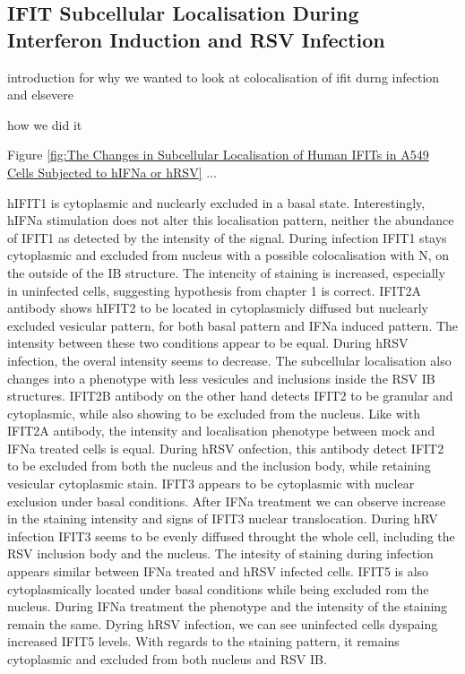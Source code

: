 \subsection{IFIT Subcellular Localisation During Interferon Induction and RSV Infection} \label{subsec:IFIT Subcellular Localisation During Interferon Induction and RSV Infection}
introduction for why we wanted to look at colocalisation of ifit durng infection and elsevere

how we did it

Figure \ref{fig:The Changes in Subcellular Localisation of Human IFITs in A549 Cells Subjected to hIFNa or hRSV} ... 

hIFIT1 is cytoplasmic and nuclearly excluded in a basal state. Interestingly, hIFNa stimulation does not alter this localisation pattern, neither the abundance of IFIT1 as detected by the intensity of the signal. During infection IFIT1 stays cytoplasmic and excluded from nucleus with a possible colocalisation with N, on the outside of the IB structure. The intencity of staining is increased, especially in uninfected cells, suggesting hypothesis from chapter 1 is correct. IFIT2A antibody shows hIFIT2 to be located in cytoplasmicly diffused but nuclearly excluded vesicular pattern, for both basal pattern and IFNa induced pattern. The intensity between these two conditions appear to be equal. During hRSV infection, the overal intensity seems to decrease. The subcellular localisation also changes into a phenotype with less vesicules and inclusions inside the RSV IB structures. IFIT2B antibody on the other hand detects IFIT2 to be granular and cytoplasmic, while also showing to be excluded from the nucleus. Like with IFIT2A antibody, the intensity and localisation phenotype between mock and IFNa treated cells is equal. During hRSV onfection, this antibody detect IFIT2 to be excluded from both the nucleus and the inclusion body, while retaining vesicular cytoplasmic stain. IFIT3 appears to be cytoplasmic with nuclear exclusion under basal conditions. After IFNa treatment we can observe increase in the staining intensity and signs of IFIT3 nuclear translocation. During hRV infection IFIT3 seems to be evenly diffused throught the whole cell, including the RSV inclusion body and the nucleus. The intesity of staining during infection appears similar between IFNa treated and hRSV infected cells. IFIT5 is also cytoplasmically located under basal conditions while being excluded rom the nucleus. During IFNa treatment the phenotype and the intensity of the staining remain the same. Dyring hRSV infection, we can see uninfected cells dyspaing increased IFIT5 levels. With regards to the staining pattern, it remains cytoplasmic and excluded from both nucleus and RSV IB.

